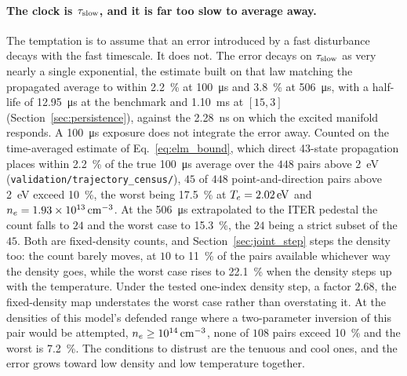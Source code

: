 \paragraph{The clock is $\tau_{\mathrm{slow}}$, and it is far too slow to average away.} The
temptation is to assume that an error introduced by a fast disturbance decays
with the fast timescale. It does not. The error decays on $\tau_{\mathrm{slow}}$ as very
nearly a single exponential, the estimate built on that law matching the
propagated average to within \SI{2.2}{\percent} at \SI{100}{\micro\second} and
\SI{3.8}{\percent} at \SI{506}{\micro\second}, with a half-life of \SI{12.95}{\micro\second} at the benchmark and
\SI{1.10}{\milli\second} at $[15,3]$ (Section~\ref{sec:persistence}), against
the \SI{2.28}{\nano\second} on which the excited manifold responds. A
\SI{100}{\micro\second} exposure does not integrate the error away.
Counted on the time-averaged estimate of Eq.~\eqref{eq:elm_bound}, which direct
43-state propagation places within \SI{2.2}{\percent} of the true
\SI{100}{\micro\second} average over the $448$ pairs above \SI{2}{\electronvolt}
(\texttt{validation/trajectory\_census/}), $45$
of $448$ point-and-direction pairs above \SI{2}{\electronvolt} exceed
\SI{10}{\percent}, the worst being \SI{17.5}{\percent} at
$T_e = \SI{2.02}{\electronvolt}$ and $n_e = \SI{1.93e13}{\per\cubic\centi\metre}$.
At the \SI{506}{\micro\second} extrapolated to the ITER pedestal
\cite[Sec.~5]{Loarte2003} the count falls to $24$ and the worst case to
\SI{15.3}{\percent}, the $24$ being a strict subset of the $45$. Both are
fixed-density counts, and Section~\ref{sec:joint_step} steps the density too:
the count barely moves, at $10$ to \SI{11}{\percent} of the pairs available
whichever way the density goes, while the worst case rises to
\SI{22.1}{\percent} when the density steps up with the temperature.
Under the tested one-index density step, a factor $2.68$, the fixed-density
map understates the worst case rather than overstating it. At the densities of
this model's defended range where a two-parameter inversion of this pair would
be attempted, $n_e\ge\SI{e14}{\per\cubic\centi\metre}$, none of $108$ pairs exceed
\SI{10}{\percent} and the worst is \SI{7.2}{\percent}. The conditions to
distrust are the tenuous and cool ones, and the error grows toward low density
and low temperature together.

